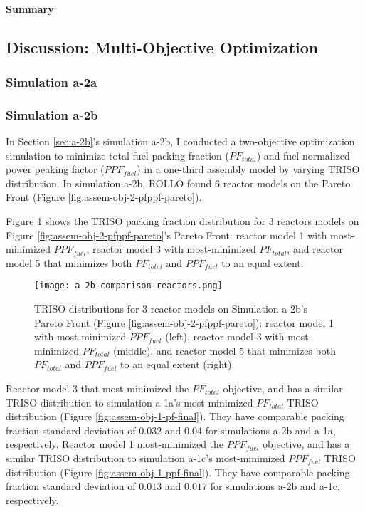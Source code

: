\paragraph{Summary}

\subsection{Discussion: Multi-Objective Optimization}
\label{sec:assem-discussion-multi}

\subsubsection{Simulation a-2a}

\subsubsection{Simulation a-2b}
In Section \ref{sec:a-2b}'s simulation a-2b, I conducted a two-objective 
optimization simulation to minimize total fuel packing fraction ($PF_{total}$) and 
fuel-normalized power peaking factor ($PPF_{fuel}$) in a one-third assembly model 
by varying TRISO distribution. 
In simulation a-2b, ROLLO found 6 reactor models on the Pareto Front (Figure 
\ref{fig:assem-obj-2-pfppf-pareto}). 

Figure \ref{fig:a-2b-comparison-reactors} shows the TRISO packing fraction distribution 
for 3 reactors models on Figure \ref{fig:assem-obj-2-pfppf-pareto}'s Pareto Front: 
reactor model 1 with most-minimized $PPF_{fuel}$, reactor model 3 with most-minimized 
$PF_{total}$, and reactor model 5 that minimizes both $PF_{total}$ and $PPF_{fuel}$ to an 
equal extent.
\begin{figure}[htbp!]
    \centering
    \texttt{[image: a-2b-comparison-reactors.png]}  
    \caption{TRISO distributions for 3 reactor models on Simulation a-2b's Pareto Front (Figure 
    \ref{fig:assem-obj-2-pfppf-pareto}): reactor model 1 with most-minimized $PPF_{fuel}$ (left), 
    reactor model 3 with most-minimized $PF_{total}$ (middle), and reactor model 5 that 
    minimizes both $PF_{total}$ and $PPF_{fuel}$ to an equal extent (right).}
    \label{fig:a-2b-comparison-reactors}
\end{figure}

Reactor model 3 that most-minimized the $PF_{total}$ objective, and has a similar TRISO 
distribution to simulation a-1a's most-minimized $PF_{total}$ TRISO distribution 
(Figure \ref{fig:assem-obj-1-pf-final}). 
They have comparable packing fraction standard deviation of $0.032$ and $0.04$ for 
simulations a-2b and a-1a, respectively. 
Reactor model 1 most-minimized the $PPF_{fuel}$ objective, and has a similar TRISO 
distribution to simulation a-1c's most-minimized $PPF_{fuel}$ TRISO distribution 
(Figure \ref{fig:assem-obj-1-ppf-final}). 
They have comparable packing fraction standard deviation of $0.013$ and $0.017$ for 
simulations a-2b and a-1c, respectively. 

